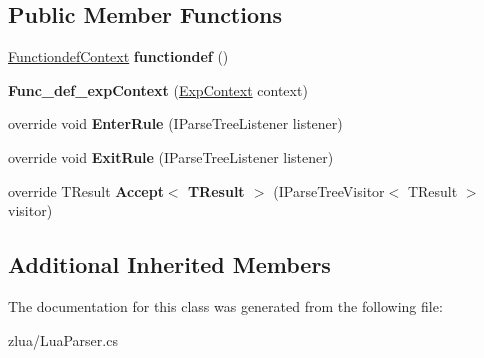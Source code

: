 \subsection*{Public Member Functions}
\begin{DoxyCompactItemize}
\item 
\mbox{\label{classzlua_1_1_lua_parser_1_1_func__def__exp_context_adadd5ba1a20549a108d48fd3d516536c}} 
\mbox{\hyperlink{classzlua_1_1_lua_parser_1_1_functiondef_context}{Functiondef\+Context}} {\bfseries functiondef} ()
\item 
\mbox{\label{classzlua_1_1_lua_parser_1_1_func__def__exp_context_a67a74ed05a671b40140778edf374924c}} 
{\bfseries Func\+\_\+def\+\_\+exp\+Context} (\mbox{\hyperlink{classzlua_1_1_lua_parser_1_1_exp_context}{Exp\+Context}} context)
\item 
\mbox{\label{classzlua_1_1_lua_parser_1_1_func__def__exp_context_afe2f0df88bf37876585fdae3c8c1a7a8}} 
override void {\bfseries Enter\+Rule} (I\+Parse\+Tree\+Listener listener)
\item 
\mbox{\label{classzlua_1_1_lua_parser_1_1_func__def__exp_context_ac83d270e2398b8dbaf4745d9fed5b9b0}} 
override void {\bfseries Exit\+Rule} (I\+Parse\+Tree\+Listener listener)
\item 
\mbox{\label{classzlua_1_1_lua_parser_1_1_func__def__exp_context_a19b4cf0237afb89de8f09e50c132dfa5}} 
override T\+Result {\bfseries Accept$<$ T\+Result $>$} (I\+Parse\+Tree\+Visitor$<$ T\+Result $>$ visitor)
\end{DoxyCompactItemize}
\subsection*{Additional Inherited Members}


The documentation for this class was generated from the following file\+:\begin{DoxyCompactItemize}
\item 
zlua/Lua\+Parser.\+cs\end{DoxyCompactItemize}
